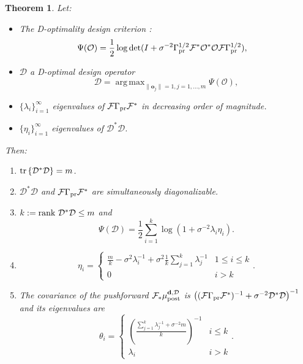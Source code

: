 \documentclass[ba]{imsart}
\newcommand{\obs}{\mathcal{O}}
\newcommand{\fwd}{\mathcal{F}}
\newcommand{\tar}{\Psi}
\DeclareMathOperator*{\argmax}{arg\,max}
\newcommand{\data}{\mathbf{d}}
\newcommand{\meas}{\mathbf{o}}
\newcommand{\tr}[1]{\textup{tr}\left \{#1 \right \} }
\newcommand{\rank}{\textup{rank}\ }
\newcommand{\opt}{\mathcal{D}}
\newcommand{\postopt}{\mu_{\textup{post}}^{\data, \opt}}
\theoremstyle{plain}
\newtheorem{theorem}{Theorem}
\theoremstyle{definition}
\theoremstyle{remark}
\begin{document}
\begin{theorem}\label{thm:char}
  Let:
  \begin{itemize}
    \item The D-optimality design criterion
    \cite{AlexanderianGloorGhattas14}:
    \begin{align*}
      \begin{split}
        \tar(\obs) &= \frac12 \log \det ( I + \sigma^{-2} \prcov^{1/2} \fwd ^*
        \obs^* \obs \fwd \prcov^{1/2}), 
      \end{split}
    \end{align*}
  \item \(\opt\) a D-optimal design operator
    \begin{equation*}
      \opt = \argmax_{\|\meas_j\| = 1, j=1,\dots,m}\tar(\obs),
    \end{equation*}
  \item \(\{\lambda_i\}_{i=1}^\infty\) eigenvalues of
    \(\fwd\prcov\fwd^*\) in decreasing order of magnitude.
\item \(\{\eta_i\}_{i=1}^\infty\) eigenvalues of \(\opt^*\opt\).
 
  \end{itemize}

  Then:
  \begin{enumerate}
  \item  \(\tr{\opt^*\opt} = m\).
  \item \(\opt^*\opt\) and \(\fwd\prcov\fwd^*\) are simultaneously
    diagonalizable.
  \item \(k := \rank \opt^*\opt \leq m\) and
    \begin{equation*}
      \tar(\opt) = \frac12 \sum_{i=1}^{k} \log (1 + \sigma^{-2}\lambda_i\eta_i). \end{equation*}
\item
    \begin{equation*}
        \eta_i = \begin{cases}
          \frac{m}{k} - \sigma^2 \lambda_i^{-1} + \sigma^2 \frac{1}{k} \sum_{j=1}^k \lambda_j^{-1} & 1 \leq i \leq k \\
          0 & i > k 
        \end{cases}.
    \end{equation*}
  \item The covariance of the pushforward \(\fwd_{*} \postopt\) is \(\left
    ( (\fwd \prcov \fwd^*)^{-1} + \sigma^{-2} \opt^*\opt \right
    )^{-1}\) and its eigenvalues are
    \begin{equation}\label{eq:cylinders}
      \theta_i =
      \begin{cases}
        \left(\frac{\sum_{j=1}^k \lambda_j^{-1} + \sigma^{-2}m}{k} \right )^{-1} & i \leq k \\
        \lambda_i &  i > k 
      \end{cases}.
    \end{equation}
  \end{enumerate}
\end{theorem}
\end{document}
